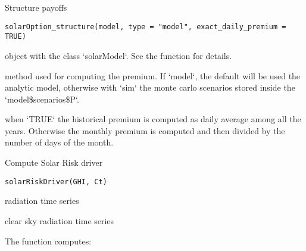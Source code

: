 \documentclass[a4paper]{book}
\begin{document}
%
\begin{Description}\relax
Structure payoffs
\end{Description}
%
\begin{Usage}
\begin{verbatim}
solarOption_structure(model, type = "model", exact_daily_premium = TRUE)
\end{verbatim}
\end{Usage}
%
\begin{Arguments}
\begin{ldescription}
\item[\code{model}] object with the class `solarModel`. See the function  for details.

\item[\code{type}] method used for computing the premium. If `model`, the default will be used the analytic model,
otherwise with `sim` the monte carlo scenarios stored inside the `model\$scenarios\$P`.

\item[\code{exact\_daily\_premium}] when `TRUE` the historical premium is computed as daily average among all the years.
Otherwise the monthly premium is computed and then divided by the number of days of the month.
\end{ldescription}
\end{Arguments}
%
\begin{Description}\relax
Compute Solar Risk driver
\end{Description}
%
\begin{Usage}
\begin{verbatim}
solarRiskDriver(GHI, Ct)
\end{verbatim}
\end{Usage}
%
\begin{Arguments}
\begin{ldescription}
\item[\code{GHI}] radiation time series

\item[\code{Ct}] clear sky radiation time series
\end{ldescription}
\end{Arguments}
%
\begin{Details}\relax
The function computes:

\end{Details}
\end{document}
